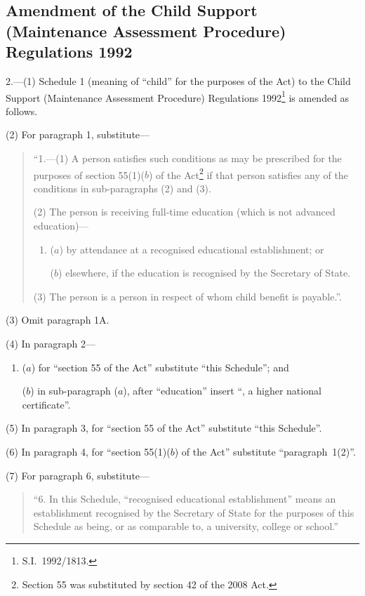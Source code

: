 \documentclass[12pt,a4paper]{article}
\begin{document}
\renewcommand\parthead{--- Part II}

\subsection[2. Amendment of the Child Support (Maintenance Assessment Procedure) Regulations 1992]{Amendment of the Child Support (Maintenance Assessment Procedure) Regulations 1992}

2.---(1)  Schedule 1 (meaning of “child” for the purposes of the Act) to the Child Support (Maintenance Assessment Procedure) Regulations 1992\footnote{S.I.~1992/1813.} is amended as follows.

(2) For paragraph 1, substitute—
\begin{quotation}
“1.---(1)   A person satisfies such conditions as may be prescribed for the purposes of section 55(1)($b$) of the Act\footnote{Section 55 was substituted by section 42 of the 2008 Act.} if that person satisfies any of the conditions in sub-paragraphs (2) and (3).

(2) The person is receiving full-time education (which is not advanced education)—
\begin{enumerate}\item[]
($a$) by attendance at a recognised educational establishment; or

($b$) elsewhere, if the education is recognised by the Secretary of State.
\end{enumerate}

(3) The person is a person in respect of whom child benefit is payable.”.
\end{quotation}

(3) Omit paragraph 1A.

(4) In paragraph 2—
\begin{enumerate}\item[]
($a$) for “section 55 of the Act” substitute “this Schedule”; and

($b$) in sub-paragraph ($a$), after “education” insert “, a higher national certificate”.
\end{enumerate}

(5) In paragraph 3, for “section 55 of the Act” substitute “this Schedule”.

(6) In paragraph 4, for “section 55(1)($b$)  of the Act” substitute “paragraph~1(2)”.

(7) For paragraph 6, substitute—
\begin{quotation}
“6.  In this Schedule, “recognised educational establishment” means an establishment recognised by the Secretary of State for the purposes of this Schedule as being, or as comparable to, a university, college or school.”
\end{quotation}
\end{document}
